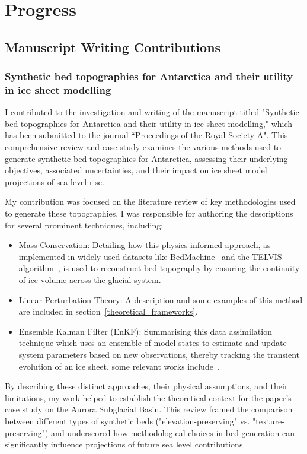 \chapter{Progress}\label{progress}
\section{Manuscript Writing Contributions}

\subsection{Synthetic bed topographies for Antarctica and their utility in ice sheet modelling}
I contributed to the investigation and writing of the manuscript titled "Synthetic bed topographies for Antarctica and their utility in ice sheet modelling," which has been submitted to the journal ``Proceedings of the Royal Society A". This comprehensive review and case study examines the various methods used to generate synthetic bed topographies for Antarctica, assessing their underlying objectives, associated uncertainties, and their impact on ice sheet model projections of sea level rise.

My contribution was focused on the literature review of key methodologies used to generate these topographies. I was responsible for authoring the descriptions for several prominent techniques, including:
\begin{itemize}
\item{Mass Conservation}: Detailing how this physics-informed approach, as implemented in widely-used datasets like BedMachine~\cite{Morlighem_2020} and the TELVIS algorithm~\cite{TELVIS_2011}, is used to reconstruct bed topography by ensuring the continuity of ice volume across the glacial system.

\item{Linear Perturbation Theory}: A description and some examples of this method are included in section~\ref{theoretical_frameworks}.

\item{Ensemble Kalman Filter (EnKF)}: Summarising this data assimilation technique which uses an ensemble of model states to estimate and update system parameters based on new observations, thereby tracking the transient evolution of an ice sheet. some relevant works include~\cite{Gillet-Chaulet_2020, Choi_2025}.
\end{itemize}

By describing these distinct approaches, their physical assumptions, and their limitations, my work helped to establish the theoretical context for the paper's case study on the Aurora Subglacial Basin. This review framed the comparison between different types of synthetic beds ("elevation-preserving" vs. "texture-preserving") and underscored how methodological choices in bed generation can significantly influence projections of future sea level contributions

